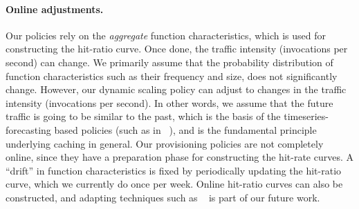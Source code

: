 \paragraph{Online adjustments.} %
Our policies rely on the \emph{aggregate} function characteristics, which is used for constructing the hit-ratio curve. 
Once done, the traffic intensity (invocations per second) can change.
We primarily assume that the probability distribution of function characteristics such as their frequency and size, does not significantly change.
However, our dynamic scaling policy can adjust to changes in the traffic intensity (invocations per second). 
In other words, we assume that the future traffic is going to be similar to the past, which is the basis of the timeseries-forecasting based policies (such as in ~\cite{shahrad_serverless_2020}), and is the fundamental principle underlying caching in general. 
%
Our provisioning policies are not completely online, since they have a preparation phase for constructing the hit-rate curves. 
A ``drift'' in function characteristics is fixed by periodically updating the hit-ratio curve, which we currently do once per week. 
Online hit-ratio curves can also be constructed, and adapting techniques such as ~\cite{zhang2020osca} is part of our future work.











